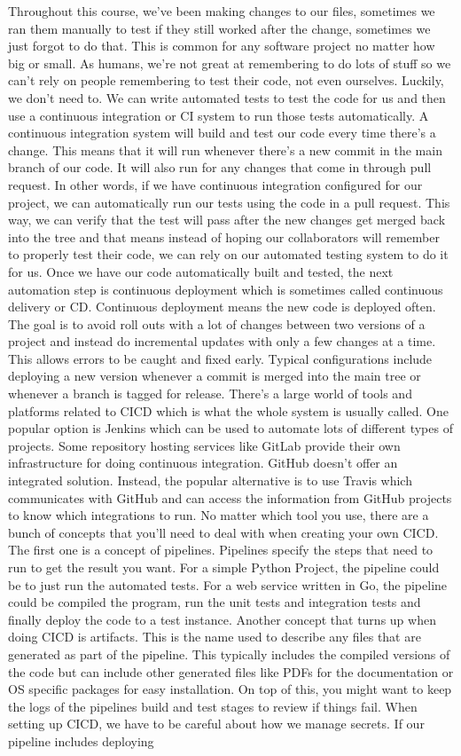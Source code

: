 	
	Throughout this course, we've been making changes to our files, sometimes we ran them manually to test if they still worked after the change, sometimes we just forgot to do that. This is common for any software project no matter how big or small. As humans, we're not great at remembering to do lots of stuff so we can't rely on people remembering to test their code, not even ourselves. Luckily, we don't need to. We can write automated tests to test the code for us and then use a continuous integration or CI system to run those tests automatically. A continuous integration system will build and test our code every time there's a change. This means that it will run whenever there's a new commit in the main branch of our code. It will also run for any changes that come in through pull request. In other words, if we have continuous integration configured for our project, we can automatically run our tests using the code in a pull request. This way, we can verify that the test will pass after the new changes get merged back into the tree and that means instead of hoping our collaborators will remember to properly test their code, we can rely on our automated testing system to do it for us. Once we have our code automatically built and tested, the next automation step is continuous deployment which is sometimes called continuous delivery or CD. Continuous deployment means the new code is deployed often. The goal is to avoid roll outs with a lot of changes between two versions of a project and instead do incremental updates with only a few changes at a time. This allows errors to be caught and fixed early. Typical configurations include deploying a new version whenever a commit is merged into the main tree or whenever a branch is tagged for release. There's a large world of tools and platforms related to CICD which is what the whole system is usually called. One popular option is Jenkins which can be used to automate lots of different types of projects. Some repository hosting services like GitLab provide their own infrastructure for doing continuous integration. GitHub doesn't offer an integrated solution. Instead, the popular alternative is to use Travis which communicates with GitHub and can access the information from GitHub projects to know which integrations to run. No matter which tool you use, there are a bunch of concepts that you'll need to deal with when creating your own CICD. The first one is a concept of pipelines. Pipelines specify the steps that need to run to get the result you want. For a simple Python Project, the pipeline could be to just run the automated tests. For a web service written in Go, the pipeline could be compiled the program, run the unit tests and integration tests and finally deploy the code to a test instance. Another concept that turns up when doing CICD is artifacts. This is the name used to describe any files that are generated as part of the pipeline. This typically includes the compiled versions of the code but can include other generated files like PDFs for the documentation or OS specific packages for easy installation. On top of this, you might want to keep the logs of the pipelines build and test stages to review if things fail. When setting up CICD, we have to be careful about how we manage secrets. If our pipeline includes deploying 